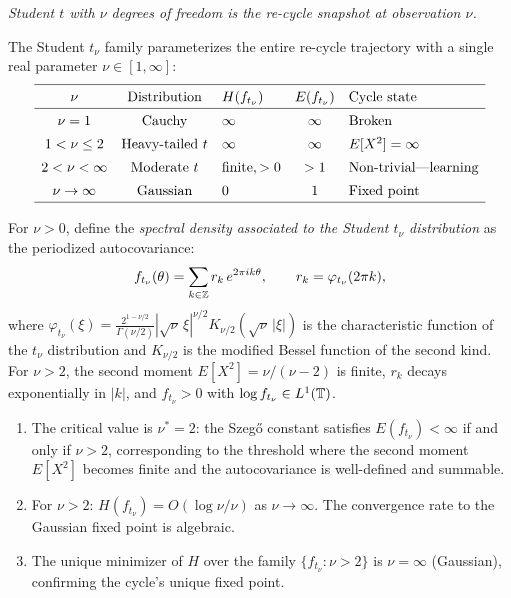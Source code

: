 \begin{example}\label{ex:student-t}
\emph{Student $t$ with $\nu$ degrees of freedom is the re-cycle snapshot at observation $\nu$.}

The Student $t_\nu$ family parameterizes the entire re-cycle trajectory with a single real parameter $\nu \in [1, \infty]$:
{\small
\[
\renewcommand{\arraystretch}{1.4}
\begin{array}{cclcl}
\hline
\nu & \text{Distribution} & H(f_{t_\nu}) & E(f_{t_\nu}) & \text{Cycle state} \\
\hline
\nu = 1 & \text{Cauchy} & \infty & \infty & \text{Broken} \\
1 < \nu \leq 2 & \text{Heavy-tailed } t & \infty & \infty & E[X^2] = \infty \\
2 < \nu < \infty & \text{Moderate } t & \text{finite}, > 0 & > 1 & \text{Non-trivial---learning} \\
\nu \to \infty & \text{Gaussian} & 0 & 1 & \text{Fixed point} \\
\hline
\end{array}
\]
}\end{example}

\begin{proposition}\label{prop:student-convergence}
For $\nu > 0$, define the \emph{spectral density associated to the Student $t_\nu$ distribution} as the periodized autocovariance:
\[
f_{t_\nu}(\theta) = \sum_{k \in \mathbb{Z}} r_k\, e^{2\pi ik\theta}, \qquad r_k = \varphi_{t_\nu}(2\pi k),
\]
where $\varphi_{t_\nu}(\xi) = \frac{2^{1-\nu/2}}{\Gamma(\nu/2)}|\sqrt{\nu}\,\xi|^{\nu/2}K_{\nu/2}(\sqrt{\nu}\,|\xi|)$ is the characteristic function of the $t_\nu$ distribution and $K_{\nu/2}$ is the modified Bessel function of the second kind. For $\nu > 2$, the second moment $E[X^2] = \nu/(\nu-2)$ is finite, $r_k$ decays exponentially in $|k|$, and $f_{t_\nu} > 0$ with $\log f_{t_\nu} \in L^1(\mathbb{T})$.
\begin{enumerate}[label=(\roman*)]
\item The critical value is $\nu^* = 2$: the Szeg\H{o} constant satisfies $E(f_{t_\nu}) < \infty$ if and only if $\nu > 2$, corresponding to the threshold where the second moment $E[X^2]$ becomes finite and the autocovariance is well-defined and summable.
\item For $\nu > 2$: $H(f_{t_\nu}) = O(\log\nu / \nu)$ as $\nu \to \infty$. The convergence rate to the Gaussian fixed point is algebraic.
\item The unique minimizer of $H$ over the family $\{f_{t_\nu} : \nu > 2\}$ is $\nu = \infty$ (Gaussian), confirming the cycle's unique fixed point.
\end{enumerate}
\end{proposition}

